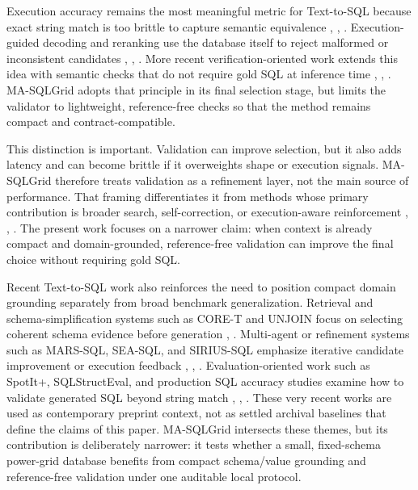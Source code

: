 \documentclass{ieeeaccess}
\begin{document}
Execution accuracy remains the most meaningful metric for Text-to-SQL because exact string match is too brittle to capture semantic equivalence \cite{zhong2020semantic}, \cite{katsogiannismeimarakis2023survey}, \cite{guo2023evaluating}. Execution-guided decoding and reranking use the database itself to reject malformed or inconsistent candidates \cite{wang2021executions}, \cite{chen2023texttosql}, \cite{li2024select}. More recent verification-oriented work extends this idea with semantic checks that do not require gold SQL at inference time \cite{huang2024survey}, \cite{beyer2022verification}, \cite{pauwels2024validation}. MA-SQLGrid adopts that principle in its final selection stage, but limits the validator to lightweight, reference-free checks so that the method remains compact and contract-compatible.

This distinction is important. Validation can improve selection, but it also adds latency and can become brittle if it overweights shape or execution signals. MA-SQLGrid therefore treats validation as a refinement layer, not the main source of performance. That framing differentiates it from methods whose primary contribution is broader search, self-correction, or execution-aware reinforcement \cite{wang2023macsql}, \cite{zhai2025excot}, \cite{pourreza2024chasesql}. The present work focuses on a narrower claim: when context is already compact and domain-grounded, reference-free validation can improve the final choice without requiring gold SQL.

Recent Text-to-SQL work also reinforces the need to position compact domain grounding separately from broad benchmark generalization. Retrieval and schema-simplification systems such as CORE-T and UNJOIN focus on selecting coherent schema evidence before generation \cite{soliman2026coret}, \cite{ganesan2025unjoin}. Multi-agent or refinement systems such as MARS-SQL, SEA-SQL, and SIRIUS-SQL emphasize iterative candidate improvement or execution feedback \cite{yang2025marssql}, \cite{li2024seasql}, \cite{luo2026siriussql}. Evaluation-oriented work such as SpotIt+, SQLStructEval, and production SQL accuracy studies examine how to validate generated SQL beyond string match \cite{tremante2026spotit}, \cite{zhou2026sqlstructeval}, \cite{arif2026agentagnostic}. These very recent works are used as contemporary preprint context, not as settled archival baselines that define the claims of this paper. MA-SQLGrid intersects these themes, but its contribution is deliberately narrower: it tests whether a small, fixed-schema power-grid database benefits from compact schema/value grounding and reference-free validation under one auditable local protocol.
\end{document}

